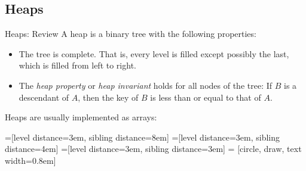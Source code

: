 \documentclass[9pt]{beamer}
\begin{document}
\subsection{Heaps}
\begin{frame}[fragile]{Heaps: Review}
  A heap is a binary tree with the following properties:
  \begin{itemize}
    \item
      The tree is complete. That is, every level is filled except possibly
      the last, which is filled from left to right.
    \item
      The {\em heap property} or {\em heap invariant} holds for all nodes of
      the tree: If $B$ is a descendant of $A$, then the key of $B$ is less
      than or equal to that of $A$.
  \end{itemize}

  \pause
  Heaps are usually implemented as arrays:

  =[level distance=3em, sibling distance=8em]
  =[level distance=3em, sibling distance=4em]
  =[level distance=3em, sibling distance=3em]
   = [circle, draw, text width=0.8em]

\end{frame}
\end{document}
